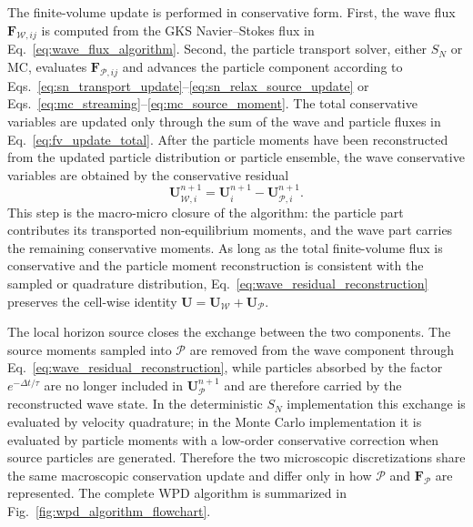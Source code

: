 \documentclass[preprint,12pt]{elsarticle}
\begin{document}
The finite-volume update is performed in conservative form. First, the wave flux $\mathbf F_{\mathcal{W},ij}$ is computed from the GKS Navier--Stokes flux in Eq.~\eqref{eq:wave_flux_algorithm}. Second, the particle transport solver, either $S_N$ or MC, evaluates $\mathbf F_{\mathcal{P},ij}$ and advances the particle component according to Eqs.~\eqref{eq:sn_transport_update}--\eqref{eq:sn_relax_source_update} or Eqs.~\eqref{eq:mc_streaming}--\eqref{eq:mc_source_moment}. The total conservative variables are updated only through the sum of the wave and particle fluxes in Eq.~\eqref{eq:fv_update_total}. After the particle moments have been reconstructed from the updated particle distribution or particle ensemble, the wave conservative variables are obtained by the conservative residual
\begin{equation}\label{eq:wave_residual_reconstruction}
    \mathbf U_{\mathcal{W},i}^{n+1}
    =
    \mathbf U_i^{n+1}
    -
    \mathbf U_{\mathcal{P},i}^{n+1}.
\end{equation}
This step is the macro-micro closure of the algorithm: the particle part contributes its transported non-equilibrium moments, and the wave part carries the remaining conservative moments. As long as the total finite-volume flux is conservative and the particle moment reconstruction is consistent with the sampled or quadrature distribution, Eq.~\eqref{eq:wave_residual_reconstruction} preserves the cell-wise identity $\mathbf U=\mathbf U_{\mathcal{W}}+\mathbf U_{\mathcal{P}}$.

The local horizon source closes the exchange between the two components. The source moments sampled into $\mathcal{P}$ are removed from the wave component through Eq.~\eqref{eq:wave_residual_reconstruction}, while particles absorbed by the factor $e^{-\Delta t/\tau}$ are no longer included in $\mathbf U_{\mathcal{P}}^{n+1}$ and are therefore carried by the reconstructed wave state. In the deterministic $S_N$ implementation this exchange is evaluated by velocity quadrature; in the Monte Carlo implementation it is evaluated by particle moments with a low-order conservative correction when source particles are generated. Therefore the two microscopic discretizations share the same macroscopic conservation update and differ only in how $\mathcal{P}$ and $\mathbf F_{\mathcal{P}}$ are represented. The complete WPD algorithm is summarized in Fig.~\ref{fig:wpd_algorithm_flowchart}.
\end{document}
